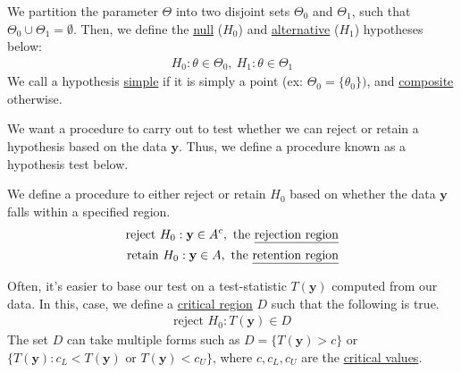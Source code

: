 \documentclass[12pt]{article}
\begin{document}
\medskip

\begin{tcolorbox}[breakable, title=\textbf{Definition}: Statistical hypothesis]
    
    We partition the parameter $\Theta$ into two disjoint sets $\Theta_0$ and $\Theta_1$, such that $\Theta_0 \cup \Theta_1 = \emptyset$. Then, we define the \underline{null} ($H_0$) and \underline{alternative} ($H_1$) hypotheses below:
    \begin{align*}
        H_0 : \theta \in \Theta_0, \ H_1 : \theta \in \Theta_1
    \end{align*}
    We call a hypothesis \underline{simple} if it is simply a point (ex: $\Theta_0 = \{\theta_0\})$, and \underline{composite} otherwise.
\end{tcolorbox}

\medskip

\noindent We want a procedure to carry out to test whether we can reject or retain a hypothesis based on the data $\textbf{y}$. Thus, we define a procedure known as a hypothesis test below.

\medskip

\begin{tcolorbox} [breakable, title=\textbf{Definition}: Statistical hypothesis test]
    
    We define a procedure to either reject or retain $H_0$ based on whether the data $\textbf{y}$ falls within a specified region.
    \begin{align*}
        \text{reject } H_0 : \textbf{y} \in A^c, \text{ the \underline{rejection region}}\\
        \text{retain } H_0 : \textbf{y} \in A, \text{ the \underline{retention region}}
    \end{align*}

    Often, it's easier to base our test on a test-statistic $T(\textbf{y})$ computed from our data. In this, case, we define a \underline{critical region} $D$ such that the following is true.
    \begin{align*}
        \text{reject } H_0: T(\textbf{y}) \in D
    \end{align*}
    The set $D$ can take multiple forms such as $D = \{T(\textbf{y}) >c\}$ or $\{T(\textbf{y} ) : c_L < T(\textbf{y}) \text{ or } T(\textbf{y}) <c_U\}$, where $c, c_L,c_U$ are the \underline{critical values}.

\end{tcolorbox}

\medskip
\end{document}
